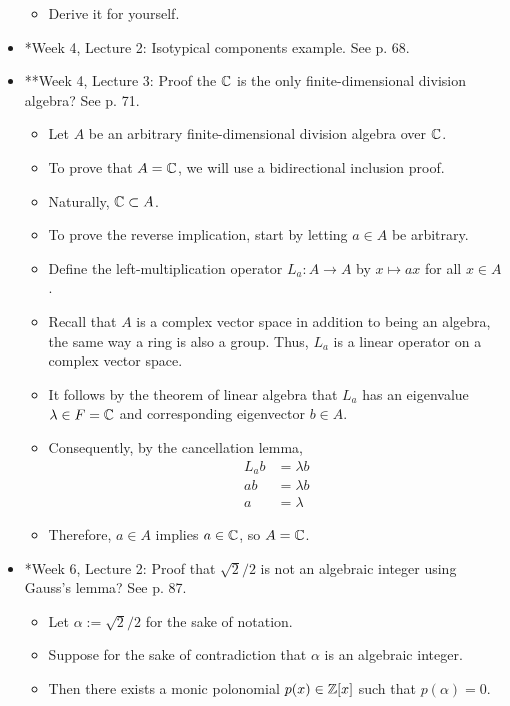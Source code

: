 \documentclass[../notes.tex]{subfiles}
\begin{document}
\begin{itemize}
    \begin{itemize}
        \item Derive it for yourself.
    \end{itemize}
    \item *Week 4, Lecture 2: Isotypical components example. See p. 68.
    \item **Week 4, Lecture 3: Proof the $\mathbb{C}$ is the only finite-dimensional division algebra? See p. 71.
    \begin{itemize}
        \item Let $A$ be an arbitrary finite-dimensional division algebra over $\mathbb{C}$.
        \item To prove that $A=\mathbb{C}$, we will use a bidirectional inclusion proof.
        \item Naturally, $\mathbb{C}\subset A$.
        \item To prove the reverse implication, start by letting $a\in A$ be arbitrary.
        \item Define the left-multiplication operator $L_a:A\to A$ by $x\mapsto ax$ for all $x\in A$.
        \item Recall that $A$ is a complex vector space in addition to being an algebra, the same way a ring is also a group. Thus, $L_a$ is a linear operator on a complex vector space.
        \item It follows by the theorem of linear algebra that $L_a$ has an eigenvalue $\lambda\in F=\mathbb{C}$ and corresponding eigenvector $b\in A$.
        \item Consequently, by the cancellation lemma,
        \begin{align*}
            L_ab &= \lambda b\\
            ab &= \lambda b\\
            a &= \lambda
        \end{align*}
        \item Therefore, $a\in A$ implies $a\in\mathbb{C}$, so $A=\mathbb{C}$.
    \end{itemize}
    \item *Week 6, Lecture 2: Proof that $\sqrt{2}/2$ is not an algebraic integer using Gauss's lemma? See p. 87.
    \begin{itemize}
        \item Let $\alpha:=\sqrt{2}/2$ for the sake of notation.
        \item Suppose for the sake of contradiction that $\alpha$ is an algebraic integer.
        \item Then there exists a monic polonomial $p(x)\in\mathbb{Z}[x]$ such that $p(\alpha)=0$.

\end{itemize}
\end{itemize}
\end{document}
